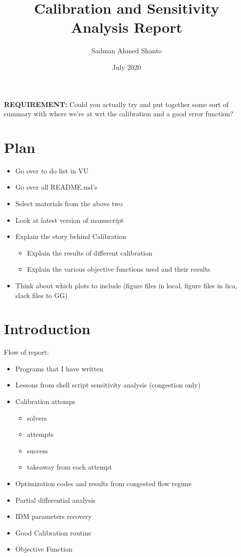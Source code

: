 \documentclass{article}
\title{Calibration and Sensitivity Analysis Report}
\author{Sadman Ahmed Shanto}
\date{July 2020}
\begin{document}
\maketitle

{\textbf{REQUIREMENT:} Could you actually try and put together some sort of summary with where we're at wrt the calibration and a good error function?}

\section*{Plan}
\begin{itemize}
    \item Go over to do list in VU
    \item Go over all README.md's
    \item Select materials from the above two
    \item Look at latest version of manuscript
    \item Explain the story behind Calibration
        \begin{itemize}
            \item Explain the results of different calibration
            \item Explain the various objective functions used and their results 
        \end{itemize}
    \item Think about which plots to include (figure files in local, figure files in lica, slack files to GG)
\end{itemize}



\section*{Introduction}
Flow of report:
\begin{itemize}
  \item Programs that I have written
  \item Lessons from shell script sensitivity analysis (congestion only)
  \item Calibration attemps 
        \begin{itemize}
            \item solvers
            \item attempts
            \item success
            \item takeaway from each attempt
        \end{itemize}
  \item Optimization codes and results from congested flow regime 
  \item Partial differential analysis
  \item IDM parameters recovery
  \item Good Calibration routine 
  \item Objective Function
\end{itemize}
\end{document}
